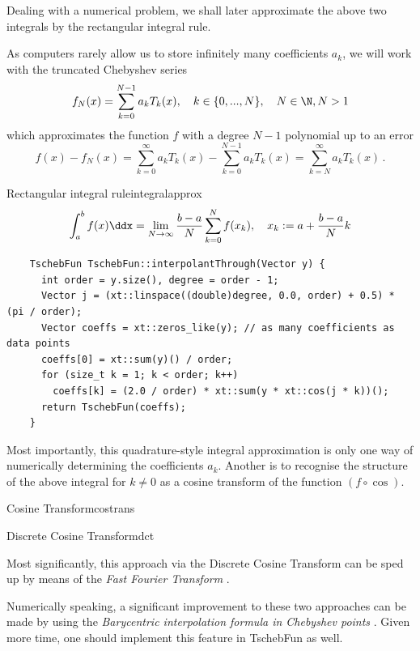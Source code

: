 \documentclass[12pt, a4paper]{article}
\begin{document}
  Dealing with a numerical problem, we shall later approximate the above two integrals by the rectangular integral rule.

  As computers rarely allow us to store infinitely many coefficients $a_k$, we will work with the truncated Chebyshev series
  $$f_N(x) = \sum_{k=0}^{N-1} a_k T_k(x), \quad k \in \{0, ..., N\},\quad N \in \N, N > 1$$
  which approximates the function $f$ with a degree $N-1$ polynomial up to an error
  $$f(x) - f_N(x) = \sum_{k=0}^{\infty} a_k T_k(x) - \sum_{k=0}^{N-1} a_k T_k(x) = \sum_{k=N}^{\infty} a_k T_k(x) \,.$$

  \begin{theorem}{Rectangular integral rule}{integralapprox}
    $$\int_a^b f(x) \ddx = \lim_{N \rightarrow \infty} \frac{b-a}{N} \sum_{k=0}^N f(x_k), \quad x_k := a + \frac{b-a}{N} k$$
  \end{theorem}
  \cite[128]{bonthuis-cp}

  \begin{verbatim}
    TschebFun TschebFun::interpolantThrough(Vector y) {
      int order = y.size(), degree = order - 1;
      Vector j = (xt::linspace((double)degree, 0.0, order) + 0.5) * (pi / order);
      Vector coeffs = xt::zeros_like(y); // as many coefficients as data points
      coeffs[0] = xt::sum(y)() / order;
      for (size_t k = 1; k < order; k++)
        coeffs[k] = (2.0 / order) * xt::sum(y * xt::cos(j * k))();
      return TschebFun(coeffs);
    }
  \end{verbatim}

  Most importantly, this quadrature-style integral approximation is only one way of numerically determining the coefficients $a_k$.
  Another is to recognise the structure of the above integral for $k \neq 0$ as a cosine transform of the function $(f \circ \cos)$.

  \begin{definition}{Cosine Transform}{costrans}
  \end{definition}

  \begin{definition}{Discrete Cosine Transform}{dct}
  \end{definition}

  Most significantly, this approach via the Discrete Cosine Transform can be sped up by means of the \emph{Fast Fourier Transform} \parencite{cooley-tukey-fft}.

  Numerically speaking, a significant improvement to these two approaches can be made by using the \emph{Barycentric interpolation formula in Chebyshev points} \parencite{atap}.
  Given more time, one should implement this feature in TschebFun as well.
\end{document}
